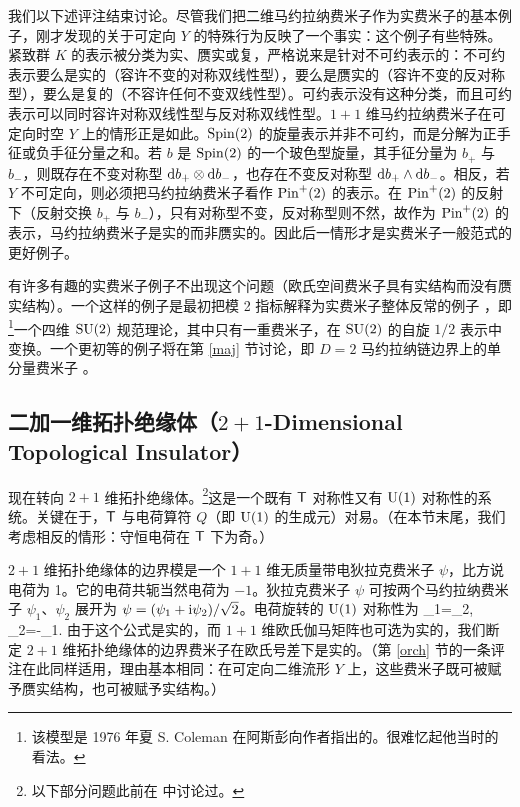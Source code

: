 
我们以下述评注结束讨论。尽管我们把二维马约拉纳费米子作为实费米子的基本例子，刚才发现的关于可定向 $Y$ 的特殊行为反映了一个事实：这个例子有些特殊。紧致群 $K$ 的表示被分类为实、赝实或复，严格说来是针对不可约表示的：不可约表示要么是实的（容许不变的对称双线性型），要么是赝实的（容许不变的反对称型），要么是复的（不容许任何不变双线性型）。可约表示没有这种分类，而且可约表示可以同时容许对称双线性型与反对称双线性型。$1+1$ 维马约拉纳费米子在可定向时空 $Y$ 上的情形正是如此。${\mathrm{Spin}}(2)$ 的旋量表示并非不可约，而是分解为正手征或负手征分量之和。若 $b$ 是 ${\mathrm{Spin}}(2)$ 的一个玻色型旋量，其手征分量为 $b_+$ 与 $b_-$，则既存在不变对称型 ${\mathrm d} b_+\otimes {\mathrm d} b_-$，也存在不变反对称型 ${\mathrm d} b_+\wedge {\mathrm d} b_-$。相反，若 $Y$ 不可定向，则必须把马约拉纳费米子看作 ${\mathrm{Pin}}^+(2)$ 的表示。在 ${\mathrm{Pin}}^+(2)$ 的反射下（反射交换 $b_+$ 与 $b_-$），只有对称型不变，反对称型则不然，故作为 ${\mathrm{Pin}}^+(2)$ 的表示，马约拉纳费米子是实的而非赝实的。因此后一情形才是实费米子一般范式的更好例子。

有许多有趣的实费米子例子不出现这个问题（欧氏空间费米子具有实结构而没有赝实结构）。一个这样的例子是最初把模 2 指标解释为实费米子整体反常的例子 \cite{Witold}，即\footnote{该模型是 1976 年夏 S. Coleman 在阿斯彭向作者指出的。很难忆起他当时的看法。}一个四维 ${\mathrm{SU}}(2)$ 规范理论，其中只有一重费米子，在 ${\mathrm{SU}}(2)$ 的自旋 $1/2$ 表示中变换。一个更初等的例子将在第 \ref{maj} 节讨论，即 $D=2$ 马约拉纳链边界上的单分量费米子 \cite{FK}。

\subsection{二加一维拓扑绝缘体（$2+1$-Dimensional Topological Insulator）}\label{welfin}

现在转向 $2+1$ 维拓扑绝缘体。\footnote{以下部分问题此前在 \cite{Hsieh} 中讨论过。}这是一个既有 ${\sf T}$ 对称性又有 ${\mathrm U}(1)$ 对称性的系统。关键在于，${\sf T}$ 与电荷算符 $Q$（即 ${\mathrm U}(1)$ 的生成元）对易。（在本节末尾，我们考虑相反的情形：守恒电荷在 ${\sf T}$ 下为奇。）

$2+1$ 维拓扑绝缘体的边界模是一个 $1+1$ 维无质量带电狄拉克费米子 $\psi$，比方说电荷为 1。它的电荷共轭当然电荷为 $-1$。狄拉克费米子 $\psi$ 可按两个马约拉纳费米子 $\psi_1$、$\psi_2$ 展开为 $\psi=(\psi_1+{\mathrm i}\psi_2)/\sqrt 2$。电荷旋转的 ${\mathrm U}(1)$ 对称性为
\be\label{delo} \delta\psi_1=\psi_2,~~ \delta\psi_2=-\psi_1.\ee
由于这个公式是实的，而 $1+1$ 维欧氏伽马矩阵也可选为实的，我们断定 $2+1$ 维拓扑绝缘体的边界费米子在欧氏号差下是实的。（第 \ref{orch} 节的一条评注在此同样适用，理由基本相同：在可定向二维流形 $Y$ 上，这些费米子既可被赋予赝实结构，也可被赋予实结构。）

